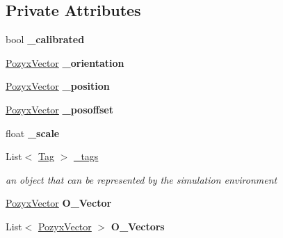 \subsection*{Private Attributes}
\begin{DoxyCompactItemize}
\item 
\mbox{\label{class_pozyx_positioner_1_1_framework_1_1_sim_object_a2059b30b30cc5672b39ee813af211fca}} 
bool {\bfseries \+\_\+calibrated}
\item 
\mbox{\label{class_pozyx_positioner_1_1_framework_1_1_sim_object_a20cac81c32c0b711c923aae1c6c8352c}} 
\hyperlink{struct_pozyx_positioner_1_1_framework_1_1_pozyx_vector}{Pozyx\+Vector} {\bfseries \+\_\+orientation}
\item 
\mbox{\label{class_pozyx_positioner_1_1_framework_1_1_sim_object_a2955942c0f03c9dfadcc5bb13127116b}} 
\hyperlink{struct_pozyx_positioner_1_1_framework_1_1_pozyx_vector}{Pozyx\+Vector} {\bfseries \+\_\+position}
\item 
\mbox{\label{class_pozyx_positioner_1_1_framework_1_1_sim_object_a27df1659477df50c36d6b0fff1b58786}} 
\hyperlink{struct_pozyx_positioner_1_1_framework_1_1_pozyx_vector}{Pozyx\+Vector} {\bfseries \+\_\+posoffset}
\item 
\mbox{\label{class_pozyx_positioner_1_1_framework_1_1_sim_object_af8b6718a875d6056b22624ea9cb6e0c9}} 
float {\bfseries \+\_\+scale}
\item 
List$<$ \hyperlink{class_pozyx_positioner_1_1_framework_1_1_tag}{Tag} $>$ \hyperlink{class_pozyx_positioner_1_1_framework_1_1_sim_object_aa84e7c3fd9b8c17e15e4ba64b0e5867b}{\+\_\+tags}
\begin{DoxyCompactList}\small\item\em an object that can be represented by the simulation environment \end{DoxyCompactList}\item 
\mbox{\label{class_pozyx_positioner_1_1_framework_1_1_sim_object_a9f70129956e360ff10ebe252d924a536}} 
\hyperlink{struct_pozyx_positioner_1_1_framework_1_1_pozyx_vector}{Pozyx\+Vector} {\bfseries O\+\_\+\+Vector}
\item 
\mbox{\label{class_pozyx_positioner_1_1_framework_1_1_sim_object_a83028e56f420485333ba365bd5949550}} 
List$<$ \hyperlink{struct_pozyx_positioner_1_1_framework_1_1_pozyx_vector}{Pozyx\+Vector} $>$ {\bfseries O\+\_\+\+Vectors}
\end{DoxyCompactItemize}



